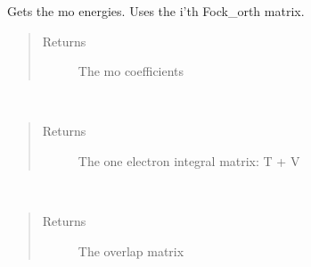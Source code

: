 \documentclass[letterpaper,10pt,english]{sphinxmanual}
\begin{document}
\begin{fulllineitems}

\begin{fulllineitems}
\label{\detokenize{GHF:hf.HartreeFock.GHF.MF.get_mo_energy}}
Gets the mo energies. Uses the i’th Fock\_orth matrix.
\begin{quote}\begin{description}
\item[{Returns}] \leavevmode
The mo coefficients

\end{description}\end{quote}

\end{fulllineitems}


\begin{fulllineitems}
\label{\detokenize{GHF:hf.HartreeFock.GHF.MF.get_one_e}}~\begin{quote}\begin{description}
\item[{Returns}] \leavevmode
The one electron integral matrix: T + V

\end{description}\end{quote}

\end{fulllineitems}


\begin{fulllineitems}
\label{\detokenize{GHF:hf.HartreeFock.GHF.MF.get_ovlp}}~\begin{quote}\begin{description}
\item[{Returns}] \leavevmode
The overlap matrix

\end{description}\end{quote}

\end{fulllineitems}


\end{fulllineitems}
\end{document}
